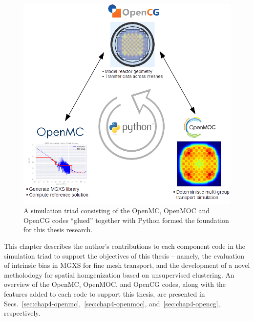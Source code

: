 \begin{figure}[h]
  \centering
  \includegraphics[width=0.8\linewidth]{figures/workflow/triad/simulation-triad}
\caption[A simulation triad of OpenMC, OpenMOC and OpenCG]{A simulation triad consisting of the OpenMC, OpenMOC and OpenCG codes ``glued'' together with Python formed the foundation for this thesis research.}
\label{fig:chap4-simulation-triad}
\end{figure}

This chapter describes the author's contributions to each component code in the simulation triad to support the objectives of this thesis -- namely, the evaluation of intrinsic bias in \ac{MGXS} for fine mesh transport, and the development of a novel metholodogy for spatial homgenization based on unsupervised clustering. An overview of the OpenMC, OpenMOC, and OpenCG codes, along with the features added to each code to support this thesis, are presented in Secs.~\ref{sec:chap4-openmc},~\ref{sec:chap4-openmoc}, and~\ref{sec:chap4-opencg}, respectively.


  
